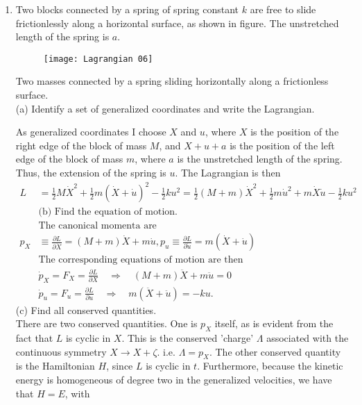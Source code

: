 \begin{enumerate}
\begin{answer}
\end{answer}
\item Two blocks connected by a spring of spring constant $k$ are free to slide frictionlessly along a horizontal surface, as shown in figure. The unstretched length of the spring is $a$.
\begin{figure}[H]
	\centering
	\texttt{[image: Lagrangian 06]}
\end{figure}
Two masses connected by a spring sliding horizontally along a frictionless surface.\\
(a) Identify a set of generalized coordinates and write the Lagrangian.
\begin{answer}
	As generalized coordinates I choose $X$ and $u$, where $X$ is the position of the right edge of the block of mass $M$, and $X+u+a$ is the position of the left edge of the block of mass $m$, where $a$ is the unstretched length of the spring. Thus, the extension of the spring is $u$. The Lagrangian is then
	\begin{align*}
	L&=\frac{1}{2} M \dot{X}^{2}+\frac{1}{2} m(\dot{X}+\dot{u})^{2}-\frac{1}{2} k u^{2}=\frac{1}{2}(M+m) \dot{X}^{2}+\frac{1}{2} m \dot{u}^{2}+m \dot{X} \dot{u}-\frac{1}{2} k u^{2}\\
	&\text{(b) Find the equation of motion.}\\
	&\text{The canonical momenta are}\\
	p_{X} &\equiv \frac{\partial L}{\partial \dot{X}}=(M+m) \dot{X}+m \dot{u}, p_{u} \equiv \frac{\partial L}{\partial \dot{u}}=m(\dot{X}+\dot{u})\\
	&\text{The corresponding equations of motion are then}\\
	&\dot{p}_{X}=F_{X}=\frac{\partial L}{\partial X} \quad \Rightarrow \quad(M+m) \ddot{X}+m \ddot{u}=0 \\
	&\dot{p}_{u}=F_{u}=\frac{\partial L}{\partial u} \quad \Rightarrow \quad m(\ddot{X}+\ddot{u})=-k u .
	\end{align*}
	(c) Find all conserved quantities.\\
	There are two conserved quantities. One is $p_{X}$ itself, as is evident from the fact that $L$ is cyclic in $X$. This is the conserved 'charge' $\Lambda$ associated with the continuous symmetry $X \rightarrow X+\zeta$. i.e. $\Lambda=p_{X}$. The other conserved quantity is the Hamiltonian $H$, since $L$ is cyclic in $t$. Furthermore, because the kinetic energy is homogeneous of degree two in the generalized velocities, we have that $H=E$, with
	\begin{align*}

\end{align*}
\end{answer}
\end{enumerate}
